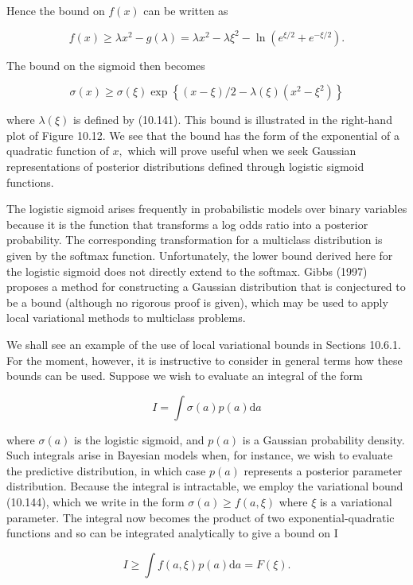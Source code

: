 \documentclass[
  10
]{article}
\begin{document}
Hence the bound on \(f ( x )\) can be written as

\[
f (x) \geqslant \lambda x ^ {2} - g (\lambda) = \lambda x ^ {2} - \lambda \xi^ {2} - \ln (e ^ {\xi / 2} + e ^ {- \xi / 2}).\tag{10.143}
\]

The bound on the sigmoid then becomes

\[
\sigma (x) \geqslant \sigma (\xi) \exp \left\{(x - \xi) / 2 - \lambda (\xi) (x ^ {2} - \xi^ {2}) \right\}\tag{10.144}
\]

where \(\lambda ( \xi )\) is defined by (10.141). This bound is
illustrated in the right-hand plot of Figure 10.12. We see that the
bound has the form of the exponential of a quadratic function of \(x ,\)
which will prove useful when we seek Gaussian representations of
posterior distributions defined through logistic sigmoid functions.

The logistic sigmoid arises frequently in probabilistic models over
binary variables because it is the function that transforms a log odds
ratio into a posterior probability. The corresponding transformation for
a multiclass distribution is given by the softmax function.
Unfortunately, the lower bound derived here for the logistic sigmoid
does not directly extend to the softmax. Gibbs (1997) proposes a method
for constructing a Gaussian distribution that is conjectured to be a
bound (although no rigorous proof is given), which may be used to apply
local variational methods to multiclass problems.

We shall see an example of the use of local variational bounds in
Sections 10.6.1. For the moment, however, it is instructive to consider
in general terms how these bounds can be used. Suppose we wish to
evaluate an integral of the form

\[
I = \int \sigma (a) p (a) \mathrm{d} a\tag{10.145}
\]

where \(\sigma ( a )\) is the logistic sigmoid, and \(p ( a )\) is a
Gaussian probability density. Such integrals arise in Bayesian models
when, for instance, we wish to evaluate the predictive distribution, in
which case \(p ( a )\) represents a posterior parameter distribution.
Because the integral is intractable, we employ the variational bound
(10.144), which we write in the form
\(\sigma ( a ) \geqslant f ( a , \xi )\) where \(\xi\) is a variational
parameter. The integral now becomes the product of two
exponential-quadratic functions and so can be integrated analytically to
give a bound on I

\[
I \geqslant \int f (a, \xi) p (a) \mathrm{d} a = F (\xi).\tag{10.146}
\]
\end{document}
